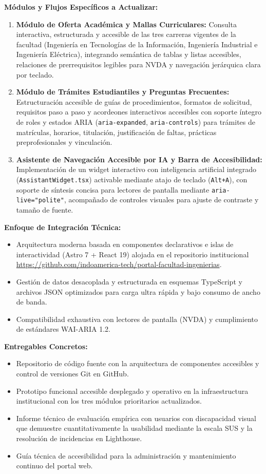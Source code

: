 \textbf{Módulos y Flujos Específicos a Actualizar:}
\begin{enumerate}
  \item \textbf{Módulo de Oferta Académica y Mallas Curriculares:} Consulta interactiva, estructurada y accesible de las tres carreras vigentes de la facultad (Ingeniería en Tecnologías de la Información, Ingeniería Industrial e Ingeniería Eléctrica), integrando semántica de tablas y listas accesibles, relaciones de prerrequisitos legibles para NVDA y navegación jerárquica clara por teclado.
  \item \textbf{Módulo de Trámites Estudiantiles y Preguntas Frecuentes:} Estructuración accesible de guías de procedimientos, formatos de solicitud, requisitos paso a paso y acordeones interactivos accesibles con soporte íntegro de roles y estados ARIA (\texttt{aria-expanded}, \texttt{aria-controls}) para trámites de matrículas, horarios, titulación, justificación de faltas, prácticas preprofesionales y vinculación.
  \item \textbf{Asistente de Navegación Accesible por IA y Barra de Accesibilidad:} Implementación de un widget interactivo con inteligencia artificial integrado (\texttt{AssistantWidget.tsx}) activable mediante atajo de teclado (\texttt{Alt+A}), con soporte de síntesis concisa para lectores de pantalla mediante \texttt{aria-live="polite"}, acompañado de controles visuales para ajuste de contraste y tamaño de fuente.
\end{enumerate}

\textbf{Enfoque de Integración Técnica:}
\begin{itemize}
  \item Arquitectura moderna basada en componentes declarativos e islas de interactividad (Astro 7 + React 19) alojada en el repositorio institucional \url{https://github.com/indoamerica-tech/portal-facultad-ingenierias}.
  \item Gestión de datos desacoplada y estructurada en esquemas TypeScript y archivos JSON optimizados para carga ultra rápida y bajo consumo de ancho de banda.
  \item Compatibilidad exhaustiva con lectores de pantalla (NVDA) y cumplimiento de estándares WAI-ARIA 1.2.
\end{itemize}

\textbf{Entregables Concretos:}
\begin{itemize}
  \item Repositorio de código fuente con la arquitectura de componentes accesibles y control de versiones Git en GitHub.
  \item Prototipo funcional accesible desplegado y operativo en la infraestructura institucional con los tres módulos prioritarios actualizados.
  \item Informe técnico de evaluación empírica con usuarios con discapacidad visual que demuestre cuantitativamente la usabilidad mediante la escala SUS y la resolución de incidencias en Lighthouse.
  \item Guía técnica de accesibilidad para la administración y mantenimiento continuo del portal web.
\end{itemize}

